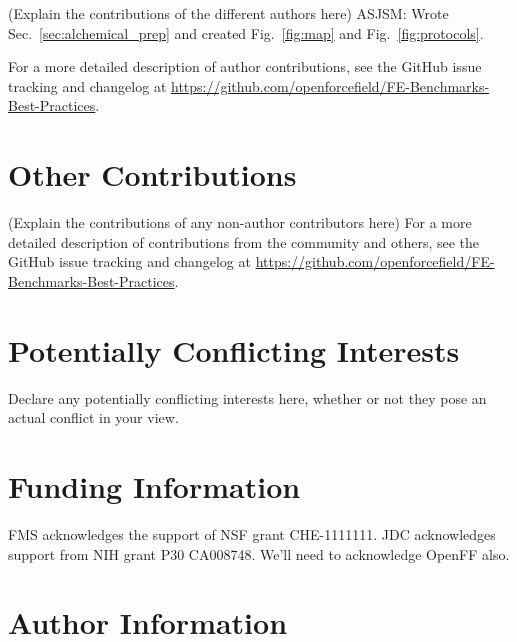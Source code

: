 \documentclass[9pt,bestpractices]{livecoms}
\newcommand{\githubrepository}{\url{https://github.com/openforcefield/FE-Benchmarks-Best-Practices}}  %
\begin{document}
(Explain the contributions of the different authors here)
ASJSM: Wrote Sec.~\ref{sec:alchemical_prep} and created Fig.~\ref{fig:map} and Fig.~\ref{fig:protocols}. 


For a more detailed description of author contributions,
see the GitHub issue tracking and changelog at \githubrepository.


\section{Other Contributions}
%

(Explain the contributions of any non-author contributors here)
For a more detailed description of contributions from the community and others, see the GitHub issue tracking and changelog at \githubrepository.

\section{Potentially Conflicting Interests}

Declare any potentially conflicting interests here, whether or not they pose an actual conflict in your view.

\section{Funding Information}
FMS acknowledges the support of NSF grant CHE-1111111.
JDC acknowledges support from NIH grant P30 CA008748.
We’ll need to acknowledge OpenFF also.

\section*{Author Information}
\makeorcid




\end{document}
